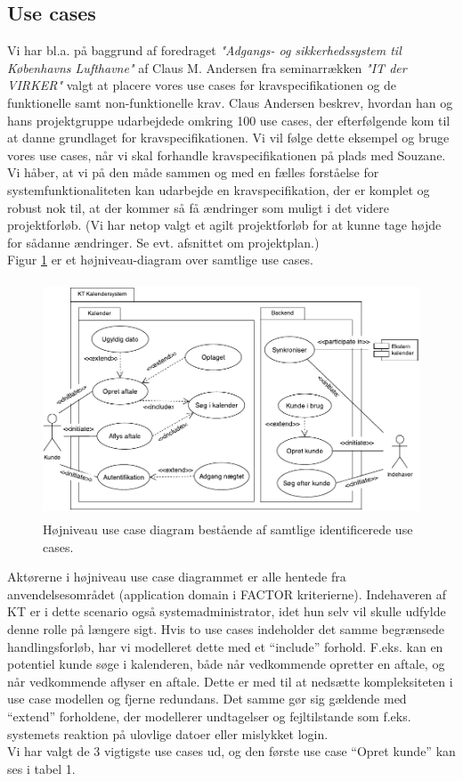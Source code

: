\documentclass[12pt]{article}   %
\begin{document}
\subsection{Use cases}
\indent Vi har bl.a. på baggrund af foredraget \emph{"Adgangs- og sikkerhedssystem til Københavns Lufthavne"} af Claus M. Andersen fra seminarrækken \emph{"IT der VIRKER"} valgt at placere vores use cases før kravspecifikationen og de funktionelle samt non-funktionelle krav. Claus Andersen beskrev, hvordan han og hans projektgruppe udarbejdede omkring 100 use cases, der efterfølgende kom til at danne grundlaget for kravspecifikationen. Vi vil følge dette eksempel og bruge vores use cases, når vi skal forhandle kravspecifikationen på plads med Souzane. Vi håber, at vi på den måde sammen og med en fælles forståelse for systemfunktionaliteten kan udarbejde en kravspecifikation, der er komplet og robust nok til, at der kommer så få ændringer som muligt i det videre projektforløb. (Vi har netop valgt et agilt projektforløb for at kunne tage højde for sådanne ændringer. Se evt. afsnittet om projektplan.)\\
\indent Figur \ref{fig:use} er et højniveau-diagram over samtlige use cases.

\begin{figure}[!ht]
\begin{center}
\includegraphics[width=14cm, height=7cm]{highlevel.pdf}
\caption{Højniveau use case diagram bestående af samtlige identificerede use cases.}
\label{fig:use}
\end{center}
\end{figure}
 
\indent Aktørerne i højniveau use case diagrammet er alle hentede fra anvendelsesområdet (application domain i FACTOR kriterierne). Indehaveren af KT er i dette scenario også systemadministrator, idet hun selv vil
skulle udfylde denne rolle på længere sigt. Hvis to use cases indeholder det samme begrænsede handlingsforløb, har vi modelleret dette med et ``include'' forhold. F.eks. kan en potentiel kunde søge i kalenderen, både når vedkommende opretter en aftale, og når vedkommende aflyser en aftale. Dette er med til at nedsætte kompleksiteten i use case modellen og fjerne redundans. Det samme gør sig gældende med ``extend'' forholdene, der modellerer undtagelser og fejltilstande som f.eks. systemets reaktion på ulovlige datoer eller mislykket login.\\
\indent Vi har valgt de 3 vigtigste use cases ud, og den første use case ``Opret kunde'' kan ses i tabel 1.\\
\end{document}
